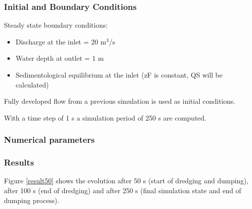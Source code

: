 %
%
\subsubsection{Initial and Boundary Conditions}
%
Steady state boundary conditions:
\begin{itemize}
\item{ Discharge at the inlet = 20 m$^3$/s}
\item Water depth at outlet = 1 m
\item Sedimentological equilibrium at the inlet (zF is constant, QS will be calculated)
\end{itemize}
Fully developed flow from a previous simulation is used as initial conditions.

With a time step of 1 s a simulation period of 250 s are computed. 
%
%
\subsubsection{Numerical parameters}
%
%
%
\subsubsection{Results}
%
Figure \ref{result50} shows the evolution after 50 s (start of dredging and dumping),
after 100 s (end of dredging) and after 250 s (final simulation state and end of dumping process).

